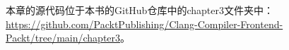 本章的源代码位于本书的GitHub仓库中的chapter3文件夹中：
 \url{https://github.com/PacktPublishing/Clang-Compiler-Frontend-Packt/tree/main/chapter3}。
